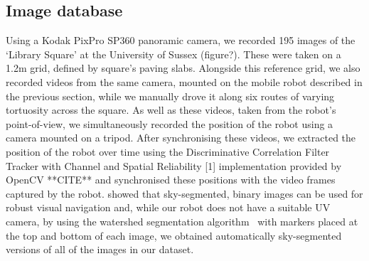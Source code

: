 \documentclass[letterpaper]{article}
\begin{document}
\subsection{Image database}
\label{image_database}
Using a Kodak PixPro SP360 panoramic camera, we recorded 195 images of the ‘Library Square’ at the University of Sussex (figure?). 
These were taken on a 1.2m grid, defined by square’s paving slabs. 
Alongside this reference grid, we also recorded videos from the same camera, mounted on the mobile robot described in the previous section, while we manually drove it along six routes of varying tortuosity across the square. 
As well as these videos, taken from the robot’s point-of-view, we simultaneously recorded the position of the robot using a camera mounted on a tripod. 
After synchronising these videos, we extracted the position of the robot over time using the Discriminative Correlation Filter Tracker with Channel and Spatial Reliability [1] implementation provided by OpenCV **CITE** and synchronised these positions with the video frames captured by the robot. 
\citet{Stone2014} showed that sky-segmented, binary images can be used for robust visual navigation and, while our robot does not have a suitable UV camera, by using the watershed segmentation algorithm~\citep{Beucher1979} with markers placed at the top and bottom of each image, we obtained automatically sky-segmented versions of all of the images in our dataset.
\end{document}
